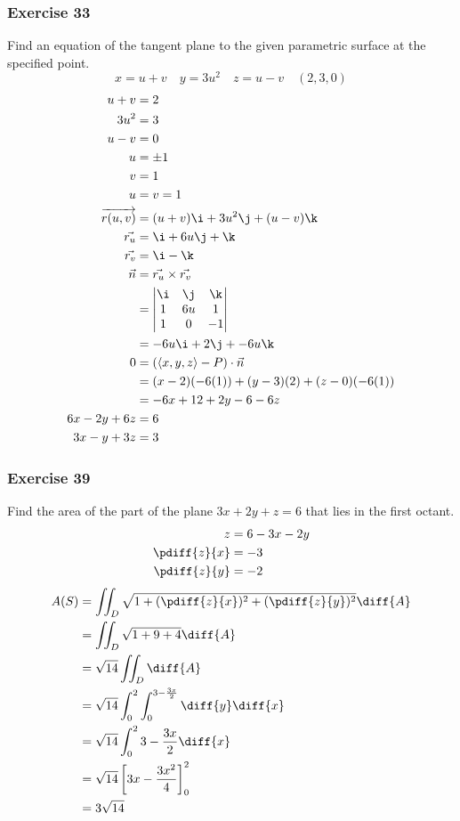 \documentclass{math}
\begin{document}
\subsubsection*{Exercise 33}
Find an equation of the tangent plane to the given parametric surface at the
specified point.
\[ x = u+v \quad y = 3u^2 \quad z = u-v \quad (2,3,0) \]
\begin{align*}
  u+v &= 2 \\
  3u^2 &= 3 \\
  u-v &= 0 \\
  u &= \pm1 \\
  v &= 1 \\
  u &= v = 1 \\
  \overrightarrow{r(u,v)} &= (u+v)\i+3u^2\j+(u-v)\k \\
  \vec{r_u} &= \i+6u\j+\k \\
  \vec{r_v} &= \i-\k \\
  \vec{n} &= \vec{r_u}\times\vec{r_v} \\
  &= \begin{vmatrix}
    \i & \j & \k \\
    1 & 6u & 1 \\
    1 & 0 & -1
  \end{vmatrix} \\
  &= -6u\i+2\j+-6u\k \\
  0 &= (\langle x,y,z\rangle-P)\cdot\vec{n} \\
  &= (x-2)(-6(1))+(y-3)(2)+(z-0)(-6(1)) \\
  &= -6x+12+2y-6-6z \\
  6x-2y+6z &= 6 \\
  3x-y+3z &= 3
\end{align*}

\subsubsection*{Exercise 39}
Find the area of the part of the plane \( 3x+2y+z = 6 \) that lies in the first
octant.
\begin{align*}
  z &= 6-3x-2y \\
  \pdiff{z}{x} &= -3 \\
  \pdiff{z}{y} &= -2
\end{align*}
\begin{align*}
  A(S) &= \iint_{D}\sqrt{1+(\pdiff{z}{x})^2+(\pdiff{z}{y})^2}\diff{A} \\
  &= \iint_{D}\sqrt{1+9+4}\diff{A} \\
  &= \sqrt{14}\iint_{D}\diff{A} \\
  &= \sqrt{14}\int_{0}^{2}\int_{0}^{3-\frac{3x}{2}}\diff{y}\diff{x} \\
  &= \sqrt{14}\int_{0}^{2}3-\frac{3x}{2}\diff{x} \\
  &= \sqrt{14}\left[3x-\frac{3x^2}{4}\right]_{0}^{2} \\
  &= 3\sqrt{14}
\end{align*}
\end{document}
